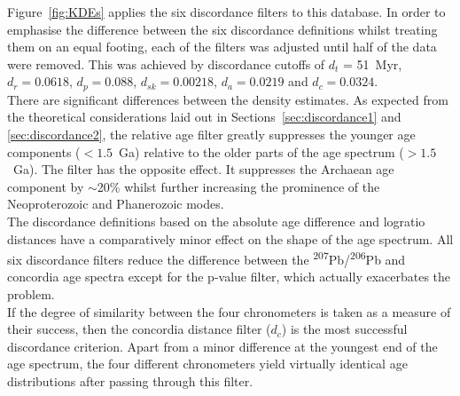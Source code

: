\documentclass[gchron, manuscript]{copernicus}
\begin{document}
Figure~\ref{fig:KDEs} applies the six discordance filters to this
database. In order to emphasise the difference between the six
discordance definitions whilst treating them on an equal footing, each
of the filters was adjusted until half of the data were removed. This
was achieved by discordance cutoffs of $d_t$ = 51~Myr, $d_r = 0.0618$,
$d_{p} = 0.088$, $d_{sk} = 0.00218$, $d_a = 0.0219$ and $d_c =
0.0324$.\\

There are significant differences between the density estimates.  As
expected from the theoretical considerations laid out in
Sections~\ref{sec:discordance1} and \ref{sec:discordance2}, the
relative age filter greatly suppresses the younger age components
($<1.5$~Ga) relative to the older parts of the age spectrum
($>1.5$~Ga). The \citet{stacey1975} filter has the opposite effect.
It suppresses the Archaean age component by $\sim$20\% whilst further
increasing the prominence of the Neoproterozoic and Phanerozoic
modes.\\

The discordance definitions based on the absolute age difference and
logratio distances have a comparatively minor effect on the shape of
the age spectrum. All six discordance filters reduce the difference
between the \textsuperscript{207}Pb/\textsuperscript{206}Pb and
concordia age spectra except for the p-value filter, which actually
exacerbates the problem.\\

If the degree of similarity between the four chronometers is taken as
a measure of their success, then the concordia distance filter ($d_c$)
is the most successful discordance criterion. Apart from a minor
difference at the youngest end of the age spectrum, the four different
chronometers yield virtually identical age distributions after passing
through this filter.\\
\end{document}
